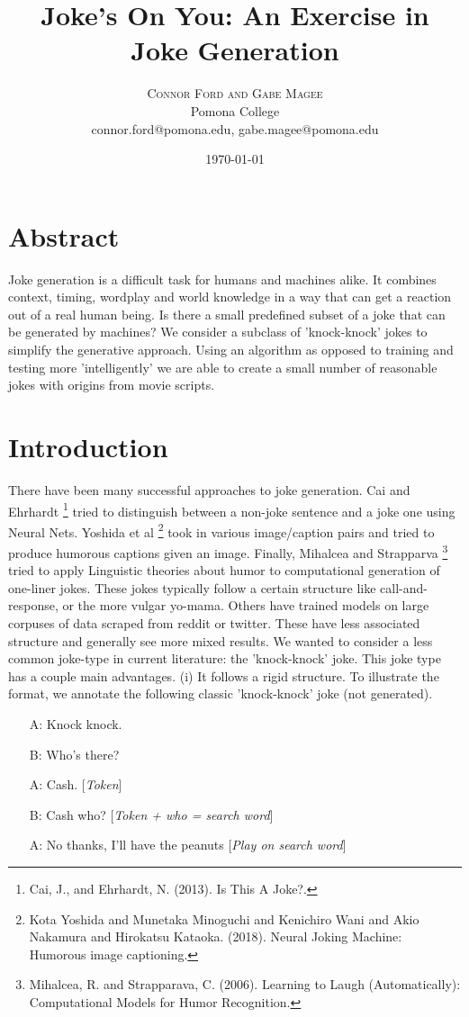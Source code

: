 \documentclass[twoside,twocolumn]{article}
\title{Joke's On You: An Exercise in Joke Generation}
\author{%
\textsc{Connor Ford and Gabe Magee} \\[1ex] 
\normalsize Pomona College \\ 
\normalsize connor.ford@pomona.edu, gabe.magee@pomona.edu
}
\date{\today}
\begin{document}
\maketitle

\section*{Abstract}

Joke generation is a difficult task for humans and machines alike. It combines context, timing, wordplay and world knowledge in a way that can get a reaction out of a real human being. Is there a small predefined subset of a joke that can be generated by machines?
We consider a subclass of 'knock-knock' jokes to simplify the generative approach.
Using an algorithm as opposed to training and testing more 'intelligently' we are able to create a small number of reasonable jokes with origins from movie scripts.

\section{Introduction}

There have been many successful approaches to joke generation. 
Cai and Ehrhardt \footnote{Cai, J., and Ehrhardt, N. (2013). Is This A Joke?.} tried to distinguish between a non-joke sentence and a joke one using Neural Nets. 
Yoshida et al \footnote{Kota Yoshida and Munetaka Minoguchi and Kenichiro Wani and Akio Nakamura and Hirokatsu Kataoka. (2018). Neural Joking Machine: Humorous image captioning.} took in various image/caption pairs and tried to produce humorous captions given an image. 
Finally, Mihalcea and Strapparva \footnote{Mihalcea, R. and Strapparava, C. (2006). Learning to Laugh (Automatically): Computational Models for Humor Recognition.} tried to apply Linguistic theories about humor to computational generation of one-liner jokes. 
These jokes typically follow a certain structure like call-and-response, or the more vulgar yo-mama. 
Others have trained models on large corpuses of data scraped from reddit or twitter. These have less associated structure and generally see more mixed results.
We wanted to consider a less common joke-type in current literature: the 'knock-knock' joke. This joke type has a couple main advantages.
(i) It follows a rigid structure. To illustrate the format, we annotate the following classic 'knock-knock' joke (not generated).
\begin{center}
\begin{enumerate}
\item[A:] Knock knock.
\item[B:] Who's there?
\item[A:] Cash. [\emph{Token}]
\item[B:] Cash who? [\emph{Token + who = search word}]
\item[A:] No thanks, I'll have the peanuts [\emph{Play on search word}]
\end{enumerate}
\end{center}
\end{document}
